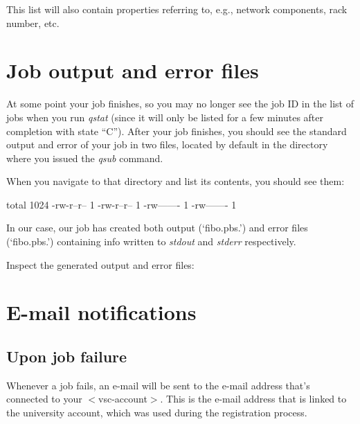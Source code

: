 This list will also contain properties referring to, e.g., network components,
rack number, etc.

\section{Job output and error files}

At some point your job finishes, so you may no longer see the job ID in the
list of jobs when you run \emph{qstat} (since it will only be listed for a few
minutes after completion with state ``C''). After your job finishes, you should
see the standard output and error of your job in two files, located by default
in the directory where you issued the \emph{qsub} command.


When you navigate to that directory and list its contents, you should see them:

\begin{prompt}
total 1024
-rw-r--r-- 1 %
-rw-r--r-- 1 %
-rw------- 1 %
-rw------- 1 %
\end{prompt}

In our case, our job has created both output (`fibo.pbs.\jobnumber') and
error files (`fibo.pbs.\jobnumber') containing info written to
\emph{stdout} and \emph{stderr} respectively.

Inspect the generated output and error files:

\begin{prompt}
\end{prompt}

\section{E-mail notifications}

\subsection{Upon job failure}

Whenever a job fails, an e-mail will be sent to the e-mail address that's
connected to your $<$vsc-account$>$. This is the e-mail address that is linked
to the university account, which was used during the registration process.

